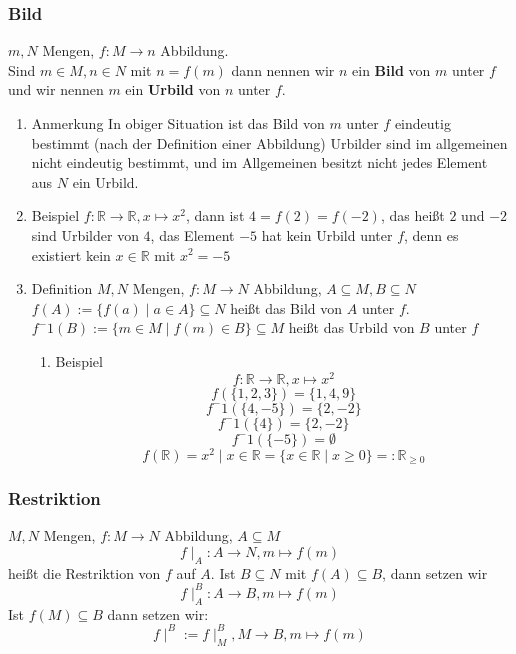 \documentclass[11pt]{article}
\begin{document}
\subsubsection{Bild}
\label{sec-2-6-4}
$m,N$ Mengen, $f:M\to n$ Abbildung. \\
    Sind $m\in M,n\in N$ mit $n = f(m)$ dann nennen wir $n$ ein \textbf{Bild} von $m$ unter $f$ und wir nennen $m$ ein \textbf{Urbild} von $n$ unter $f$.
\begin{enumerate}
\item Anmerkung
\label{sec-2-6-4-1}
In obiger Situation ist das Bild von $m$ unter $f$ eindeutig bestimmt (nach der Definition einer Abbildung)
Urbilder sind im allgemeinen nicht eindeutig bestimmt, und im Allgemeinen besitzt nicht jedes Element aus $N$ ein Urbild.
\item Beispiel
\label{sec-2-6-4-2}
$f:\mathbb{R}\to\mathbb{R},x\mapsto x^2$, dann ist $4=f(2) = f(-2)$, das heißt $2$ und $-2$ sind Urbilder von $4$, das Element $-5$ hat kein Urbild unter $f$, denn es existiert kein $x\in\mathbb{R}$ mit $x^2 = -5$
\item Definition
\label{sec-2-6-4-3}
$M, N$ Mengen, $f:M\to N$ Abbildung, $A\subseteq M, B\subseteq N$ \\
     $f(A) := \{f(a)\mid a\in A\} \subseteq N$ heißt das Bild von $A$ unter $f$. \\
     $f^-1(B) := \{m\in M\mid f(m) \in B\} \subseteq M$ heißt das Urbild von $B$ unter $f$
\begin{enumerate}
\item Beispiel
\label{sec-2-6-4-3-1}
\[f:\mathbb{R}\to\mathbb{R},x\mapsto x^2\]
\[f(\{1,2,3\}) = \{1,4,9\}\]
\[f^-1(\{4,-5\}) = \{2,-2\}\]
\[f^-1(\{4\}) = \{2,-2\}\]
\[f^-1(\{-5\}) = \emptyset\]
\[f(\mathbb{R}) = {x^2\mid x\in \mathbb{R}} = \{x\in\mathbb{R}\mid x\geq 0\} =:\mathbb{R}_{\geq 0}\]
\end{enumerate}
\end{enumerate}
\subsubsection{Restriktion}
\label{sec-2-6-5}
$M,N$ Mengen, $f:M\to N$ Abbildung, $A\subseteq M$
\[f\mid_A:A\to N, m\mapsto f(m)\]
heißt die Restriktion von $f$ auf $A$.
Ist $B\subseteq N$ mit $f(A) \subseteq B$, dann setzen wir
\[f\mid_A^B: A\to B,m\mapsto f(m)\]
Ist $f(M) \subseteq B$ dann setzen wir:
\[f\mid^B := f\mid_M^B,M\to B, m\mapsto f(m)\]
\end{document}
